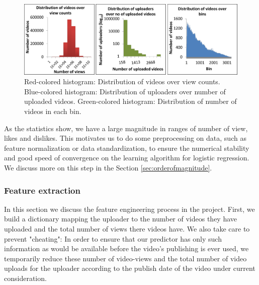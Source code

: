 		\begin{figure}[!h]
			\begin{center}
				\includegraphics[width=1.0\textwidth,clip]{distributions.pdf}
			\end{center}
			\caption{Red-colored histogram: Distribution of videos over view counts. Blue-colored histogram: Distribution of uploaders over number of uploaded videos. Green-colored histogram: Distribution of number of videos in each bin.}
			\label{fig:histograms}
		\end{figure}
	
		As the statistics show, we have a large magnitude in ranges of number of view, likes and dislikes. This motivates us to do some preprocessing on data, such as feature normalization or data standardization, to ensure the numerical stability and good speed of convergence on the learning algorithm for logistic regression. We discuss more on this step in the Section \ref{sec:orderofmagnitude}.
						
	\subsubsection{Feature extraction}
		In this section we discuss the feature engineering process in the project. First, we build a dictionary mapping the uploader to the number of videos they have uploaded and the total number of views there videos have. We also take care to prevent "cheating":  In order to ensure that our predictor has only such information as would be available before the video's publishing is ever used, we temporarily reduce these number of video-views and the total number of video uploads for the uploader according to the publish date of the video under current consideration.


